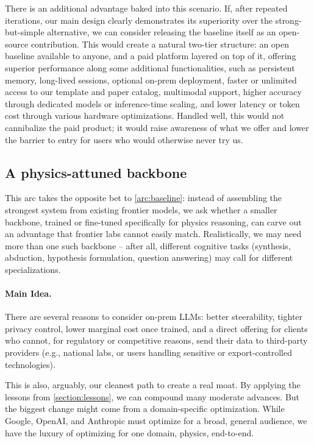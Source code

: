 There is an additional advantage baked into this scenario. If, after repeated iterations, our main design clearly demonstrates its superiority over the strong-but-simple alternative, we can consider releasing the baseline itself as an open-source contribution. This would create a natural two-tier structure: an open baseline available to anyone, and a paid platform layered on top of it, offering superior performance along some additional functionalities, such as persistent memory, long-lived sessions, optional on-prem deployment, faster or unlimited access to our template and paper catalog, multimodal support, higher accuracy through dedicated models or inference-time scaling, and lower latency or token cost through various hardware optimizations. Handled well, this would not cannibalize the paid product; it would raise awareness of what we offer and lower the barrier to entry for users who would otherwise never try us.


\subsection{A physics-attuned backbone}
\label{arc:backbone}

\begin{summarybox}
    This arc takes the opposite bet to \ref{arc:baseline}: instead of assembling the strongest system from existing frontier models, we ask whether a smaller backbone, trained or fine-tuned specifically for physics reasoning, can carve out an advantage that frontier labs cannot easily match. Realistically, we may need more than one such backbone
    -- after all, different cognitive tasks (synthesis, abduction, hypothesis formulation, question answering) may call for different specializations.
\end{summarybox}

\paragraph{Main Idea.}
There are several reasons to consider on-prem LLMs: better steerability, tighter privacy control, lower marginal cost once trained, and a direct offering for clients who cannot, for regulatory or competitive reasons, send their data to third-party providers (e.g., national labs, or users handling sensitive or export-controlled technologies).

This is also, arguably, our cleanest path to create a real moat. By applying the lessons from \ref{section:lessons}, we can compound many moderate advances. But the biggest change might come from a domain-specific optimization. While Google, OpenAI, and Anthropic must optimize for a broad, general audience, we have the luxury of optimizing for one domain, physics, end-to-end.

